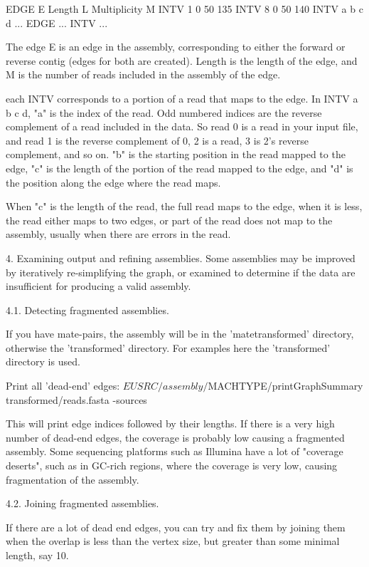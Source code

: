\documentclass{article}[12pt]
\begin{document}
	 EDGE E Length L Multiplicity M
	 INTV 1 0 50 135
	 INTV 8 0 50 140
	 INTV a b c  d
	 ...
	 EDGE ...
	 INTV ...

	 The edge E is an edge in the assembly, corresponding to either the
	 forward or reverse contig (edges for both are created).  Length is
	 the length of the edge, and M is the number of reads included in
	 the assembly of the edge.

	 each INTV corresponds to a portion of a read that maps to the
	 edge.  In INTV a b c d, "a" is the index of the read.  Odd numbered
	 indices are the reverse complement of a read included in the
	 data. So read 0 is a read in your input file, and read 1 is the
	 reverse complement of 0, 2 is a read, 3 is 2's reverse complement,
	 and so on.  "b" is the starting position in the read mapped to the
	 edge, "c" is the length of the portion of the read mapped to the
	 edge, and "d" is the position along the edge where the read maps.

	 When "c" is the length of the read, the full read maps to the
	 edge, when it is less, the read either maps to two edges, or part
	 of the read does not map to the assembly, usually when there are
	 errors in the read.


4. Examining output and refining assemblies.
	 Some assemblies may be improved by iteratively re-simplifying the
	 graph, or examined to determine if the data are insufficient for
	 producing a valid assembly.

    4.1. Detecting fragmented assemblies.

		If you have mate-pairs, the assembly will be in the
		'matetransformed' directory, otherwise the 'transformed'
		directory.  For examples here the 'transformed' directory is used.
		
		Print all 'dead-end' edges:
		 ${EUSRC}/assembly/${MACHTYPE}/printGraphSummary transformed/reads.fasta -sources

		This will print edge indices followed by their lengths. If there
		is a very high number of dead-end edges, the coverage is probably
		low causing a fragmented assembly.  Some sequencing platforms such
		as Illumina have a lot of "coverage deserts", such as in GC-rich
		regions, where the coverage is very low, causing fragmentation of
		the assembly.


    4.2. Joining fragmented assemblies.

		If there are a lot of dead end edges, you can try and fix them by
		joining them when the overlap is less than the vertex size, but
		greater than some minimal length, say 10.
\end{document}
